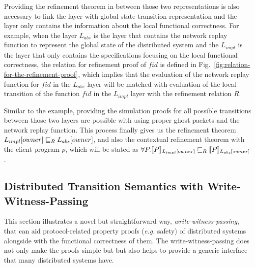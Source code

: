 Providing the refinement theorem in between those two representations is also necessary to link the layer with global state transition representation and the layer only contains the information about the local functional correctness.
For example, when the layer $L_{abs}$ is the layer that contains the network replay function to represent the global state of the distributed system and the $L_{impl}$ is the layer that only contains the specifications focusing on the local functional correctness, 
the relation for refinement proof of $fid$ is defined in Fig.~\ref{fig:relation-for-the-refinement-proof}, 
which implies that the evaluation of the network replay function  for $fid$ in the $L_{abs}$  layer 
will be matched with evaluation of the local transition of the function $fid$ in the $L_{impl}$ layer 
with the refinement relation $R$.

Similar to the example, providing the simulation proofs for all possible transitions between 
those two layers are possible with using proper ghost packets and the network replay function.
This process finally gives us the refinement theorem 
$L_{impl}[owner]  \refines_R L_{abs}[owner]$, and also the contextual refinement theorem 
with the client program $p$, which will be stated as $\forall{}P.\sem{L_{impl}[owner]}{P} \refines_R \sem{L_{abs}[owner]}{P}$.

\subsection{Distributed Transition Semantics with Write-Witness-Passing}
\label{subsec:distributed-transition-semantics-with-witness-passing}
\newcommand{\ballotnum}{\mathrm{bn}}
\newcommand{\votedballotnum}{\mathrm{vbn}}
\newcommand{\isquorums}{\mathrm{is}\_\mathrm{qrm}}
\newcommand{\dsvalue}{\mathrm{val}}
\newcommand{\nodeid}{\mathrm{nid}}
\newcommand{\partialset}{\mathrm{accs}}
\newcommand{\acceptors}{\mathrm{ASET}}
\newcommand{\funwitness}{\mathcal{F}_{\witness}}
\newcommand{\getbn}{\mathrm{getBN}}
\newcommand{\getvbn}{\mathrm{getVBN}_{msg}}
\newcommand{\getvbnp}{\mathrm{getVBN}_{\packet}}
\newcommand{\getdsvalue}{\mathrm{getVal}_{\packet}}
\newcommand{\getwitness}{\mathrm{get}\witness_{\packet_{\witness}}}
\newcommand{\projpkt}{\mathrm{proj}_{\packet}}
\newcommand{\projnet}{\mathrm{proj}_{\mathrm{net}}}

This section illustrates a novel but straightforward way, \textit{write-witness-passing}, that can aid protocol-related property proofs (\textit{e.g.} safety) of distributed systems alongside with the functional correctness of them. 
The write-witness-passing does not only make the proofs simple but 
but also helps to provide a generic interface that many distributed systems have.


